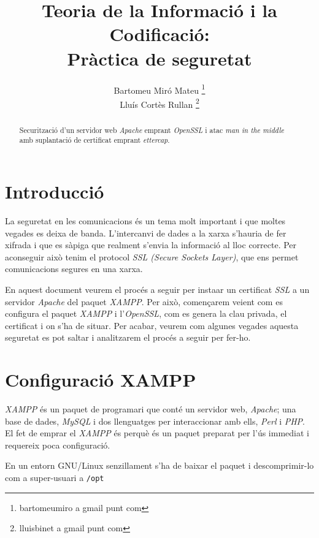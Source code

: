 \documentclass[a4paper,11pt]{scrartcl}
\title{Teoria de la Informació i la Codificació: \\ Pràctica de seguretat}
\author{ Bartomeu Miró Mateu \thanks{bartomeumiro a gmail punt com} \\
	 Lluís Cortès Rullan \thanks{lluisbinet a gmail punt com} }
\begin{document}
  \maketitle

  \begin{abstract}
    Securització d'un servidor web \emph{Apache} emprant \emph{OpenSSL} i
atac \emph{man in the middle} amb suplantació de certificat emprant \emph{ettercap}.
  \end{abstract}

  \newpage

\section{Introducció}

La seguretat en les comunicacions és un tema molt important i que moltes
vegades es deixa de banda. L'intercanvi de dades a la xarxa s'hauria de fer xifrada
 i que es sàpiga que realment s'envia la informació al lloc
correcte. Per aconseguir això tenim el protocol \emph{SSL (Secure Sockets Layer)}, que
ens permet comunicacions segures en una xarxa. 


En aquest document veurem el procés a seguir per insta\lgem ar un certificat \emph{SSL} a
un servidor \emph{Apache} del paquet \emph{XAMPP}. Per això, començarem veient com es
configura el paquet \emph{XAMPP} i l'\emph{OpenSSL}, com es genera la clau privada, el
certificat i on s'ha de situar. Per acabar, veurem com algunes vegades aquesta
seguretat es pot saltar i analitzarem el procés a seguir per fer-ho. 

\section{Configuració XAMPP}
\emph{XAMPP} és un paquet de programari que conté un servidor web, \emph{Apache}; una base 
de dades, \emph{MySQL} i dos llenguatges per interaccionar amb ells, \emph{Perl} i \emph{PHP}. El
fet de emprar el \emph{XAMPP} és perquè és un paquet preparat per l'ús immediat i
requereix poca configuració.

En un entorn GNU/Linux senzillament s'ha de baixar el paquet i descomprimir-lo
com a super-usuari a \texttt{/opt}
\end{document}
